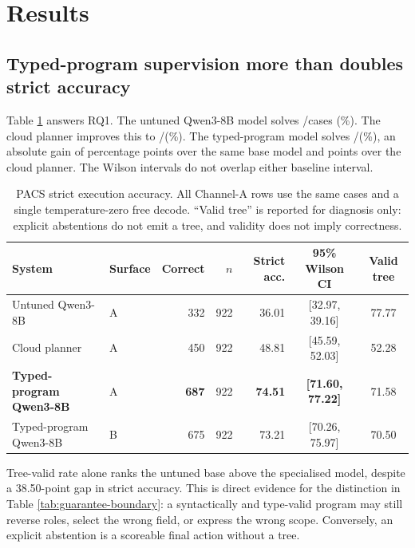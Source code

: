 \section{Results}
\label{sec:results}

\subsection{Typed-program supervision more than doubles strict accuracy}

Table \ref{tab:pacs-main} answers RQ1.  The untuned Qwen3-8B model solves
\PacsBaseCorrect/\PacsN cases (\PacsBaseA\%).  The cloud planner improves this to
\PacsTeacherCorrect/\PacsN (\PacsTeacherA\%).  The typed-program model solves
\PacsOursCorrectA/\PacsN (\PacsOursA\%), an absolute gain of \PacsGainBase{} percentage points
over the same base model and \PacsGainTeacher{} points over the cloud planner.  The Wilson
intervals do not overlap either baseline interval.

\begin{table}[t]
  \caption{PACS strict execution accuracy.  All Channel-A rows use the same \PacsN{} cases and a
  single temperature-zero free decode.  ``Valid tree'' is reported for diagnosis only: explicit
  abstentions do not emit a tree, and validity does not imply correctness.}
  \label{tab:pacs-main}
  \centering
  \small
  \begin{tabular}{llrrrcc}
    \toprule
    System & Surface & Correct & $n$ & Strict acc. & 95\% Wilson CI & Valid tree \\
    \midrule
    Untuned Qwen3-8B & A & 332 & 922 & 36.01 & [32.97, 39.16] & 77.77 \\
    Cloud planner & A & 450 & 922 & 48.81 & [45.59, 52.03] & 52.28 \\
    \textbf{Typed-program Qwen3-8B} & A & \textbf{687} & 922 & \textbf{74.51}
      & \textbf{[71.60, 77.22]} & 71.58 \\
    Typed-program Qwen3-8B & B & 675 & 922 & 73.21 & [70.26, 75.97] & 70.50 \\
    \bottomrule
  \end{tabular}
\end{table}

Tree-valid rate alone ranks the untuned base above the specialised model, despite a 38.50-point
gap in strict accuracy.  This is direct evidence for the distinction in Table
\ref{tab:guarantee-boundary}: a syntactically and type-valid program may still reverse roles,
select the wrong field, or express the wrong scope.  Conversely, an explicit abstention is a
scoreable final action without a tree.

